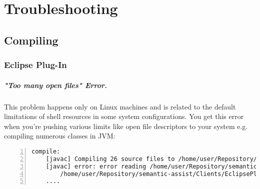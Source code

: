 
\chapter{Troubleshooting}
\section{Compiling}
\subsection{Eclipse Plug-In}
\paragraph{"Too many open files" Error.} This problem happens only on
Linux machines and is related to the default limitations of shell
resources in some system configurations. You get this error
when you're pushing various limits like open file descriptors to your
system e.g. compiling numerous classes in JVM:


\begin{lstlisting}[language=Ant,xleftmargin=8mm,columns=flexible,numbers=left]
compile:
    [javac] Compiling 26 source files to /home/user/Repository/semantic-assist/Clients/EclipsePlugin/bin
    [javac] error: error reading /home/user/Repository/semantic-assist/Clients/EclipsePlugin/src/info/semanticsoftware/semassist/client/eclipse/Activator.java; 
        /home/user/Repository/semantic-assist/Clients/EclipsePlugin/src/info/semanticsoftware/semassist/client/eclipse/Activator.java (Too many open files)
    ....
\end{lstlisting}

